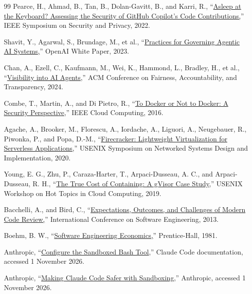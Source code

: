 \documentclass[12pt,a4paper,oneside]{report}
\begin{document}
\begin{thebibliography}{99}
 Pearce, H., Ahmad, B., Tan, B., Dolan-Gavitt, B., and Karri, R., ``\href{https://doi.org/10.1109/SP46214.2022.9833571}{Asleep at the Keyboard? Assessing the Security of GitHub Copilot's Code Contributions,}'' IEEE Symposium on Security and Privacy, 2022.

 Shavit, Y., Agarwal, S., Brundage, M., et al., ``\href{https://openai.com/index/practices-for-governing-agentic-ai-systems/}{Practices for Governing Agentic AI Systems,}'' OpenAI White Paper, 2023.

 Chan, A., Ezell, C., Kaufmann, M., Wei, K., Hammond, L., Bradley, H., et al., ``\href{https://doi.org/10.1145/3630106.3658948}{Visibility into AI Agents,}'' ACM Conference on Fairness, Accountability, and Transparency, 2024.

 Combe, T., Martin, A., and Di Pietro, R., ``\href{https://doi.org/10.1109/MCC.2016.100}{To Docker or Not to Docker: A Security Perspective,}'' IEEE Cloud Computing, 2016.

 Agache, A., Brooker, M., Florescu, A., Iordache, A., Liguori, A., Neugebauer, R., Piwonka, P., and Popa, D.-M., ``\href{https://www.usenix.org/conference/nsdi20/presentation/agache}{Firecracker: Lightweight Virtualization for Serverless Applications,}'' USENIX Symposium on Networked Systems Design and Implementation, 2020.

 Young, E. G., Zhu, P., Caraza-Harter, T., Arpaci-Dusseau, A. C., and Arpaci-Dusseau, R. H., ``\href{https://www.usenix.org/conference/hotcloud19/presentation/young}{The True Cost of Containing: A gVisor Case Study,}'' USENIX Workshop on Hot Topics in Cloud Computing, 2019.

 Bacchelli, A., and Bird, C., ``\href{https://doi.org/10.1109/ICSE.2013.6606617}{Expectations, Outcomes, and Challenges of Modern Code Review,}'' International Conference on Software Engineering, 2013.

 Boehm, B. W., ``\href{https://www.pearson.com/en-us/subject-catalog/p/software-engineering-economics/P200000000306}{Software Engineering Economics,}'' Prentice-Hall, 1981.

 Anthropic, ``\href{https://code.claude.com/docs/en/sandboxing}{Configure the Sandboxed Bash Tool,}'' Claude Code documentation, accessed 1 November 2026.

 Anthropic, ``\href{https://www.anthropic.com/research/claude-code-sandboxing}{Making Claude Code Safer with Sandboxing,}'' Anthropic, accessed 1 November 2026.


\end{thebibliography}
\end{document}
